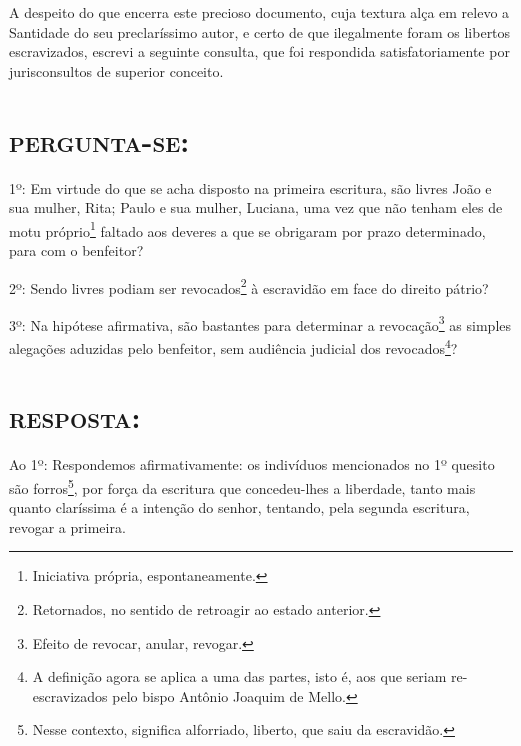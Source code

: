 A despeito do que encerra este precioso documento, cuja textura alça em
relevo a Santidade do seu preclaríssimo autor, e certo de que
ilegalmente foram os libertos escravizados, escrevi a seguinte consulta,
que foi respondida satisfatoriamente por jurisconsultos de superior
conceito.

\section{\textsc{pergunta-se}:}

1º: Em virtude do que se acha disposto na primeira escritura, são livres
João e sua mulher, Rita; Paulo e sua mulher, Luciana, uma vez que não
tenham eles de motu próprio\footnote{Iniciativa própria,
  espontaneamente.} faltado aos deveres a que se obrigaram por prazo
determinado, para com o benfeitor?

2º: Sendo livres podiam ser revocados\footnote{Retornados, no sentido
  de retroagir ao estado anterior.} à escravidão em face do direito
pátrio?

3º: Na hipótese afirmativa, são bastantes para determinar a
revocação\footnote{Efeito de revocar, anular, revogar.} as simples
alegações aduzidas pelo benfeitor, sem audiência judicial dos
revocados\footnote{A definição agora se aplica a uma das partes, isto
  é, aos que seriam re-escravizados pelo bispo Antônio Joaquim de Mello.}?

\section{\textsc{resposta}:}

Ao 1º: Respondemos afirmativamente: os indivíduos mencionados no 1º
quesito são forros\footnote{Nesse contexto, significa alforriado,
  liberto, que saiu da escravidão.}, por força da escritura que
concedeu-lhes a liberdade, tanto mais quanto claríssima é a intenção do
senhor, tentando, pela segunda escritura, revogar a primeira.

